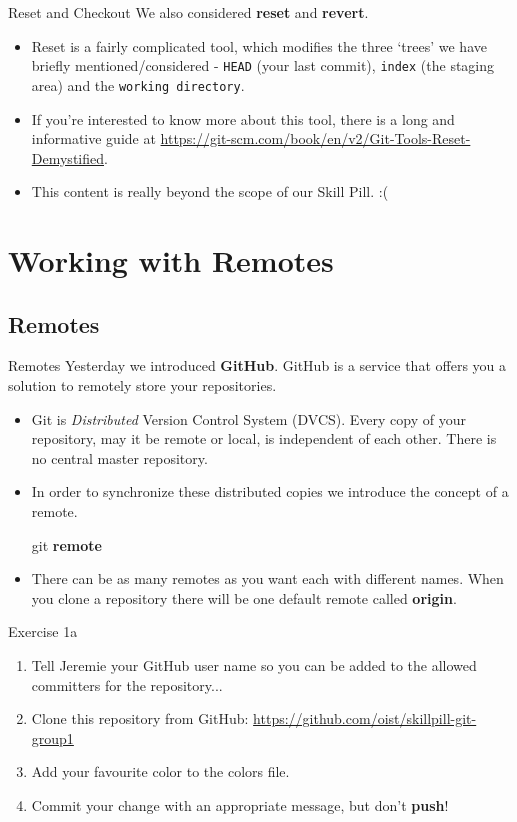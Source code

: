 \documentclass{beamer}
\begin{document}
\begin{frame}[fragile]{Reset and Checkout}
  We also considered \textbf{reset} and \textbf{revert}.
  \begin{itemize}
    \item Reset is a fairly complicated tool, which modifies the three \lq{}trees\rq{} we have briefly mentioned/considered - \texttt{HEAD} (your last commit), \texttt{index} (the staging area) and the \texttt{working directory}.
    \item If you\rq{}re interested to know more about this tool, there is a long and informative guide at \url{https://git-scm.com/book/en/v2/Git-Tools-Reset-Demystified}.
    \item This content is really beyond the scope of our Skill Pill. :(
  \end{itemize}
\end{frame}


\section{Working with Remotes}
\subsection{Remotes}
\begin{frame}[fragile]{Remotes}
Yesterday we introduced \textbf{GitHub}. GitHub is a service that offers you a solution to remotely store your repositories.
\begin{itemize}
    \item Git is \emph{Distributed} Version Control System (DVCS). Every copy of your repository, may it be remote or local, is independent of each other. There is no central master repository. 
    \item In order to synchronize these distributed copies we introduce the concept of a remote.
  \begin{block}{}
    git \textbf{remote}
  \end{block}
  \item There can be as many remotes as you want each with different names. When you clone a repository there will be one default remote called \textbf{origin}.
\end{itemize}
\end{frame}

\begin{frame}
  \begin{block}{Exercise 1a}
    \begin{enumerate}
      \item Tell Jeremie your GitHub user name so you can be added to the allowed committers for the repository...
      \item Clone this repository from GitHub: \url{https://github.com/oist/skillpill-git-group1}
      \item Add your favourite color to the colors file.
      \item Commit your change with an appropriate message, but don\rq{}t \textbf{push}!
    \end{enumerate}
  \end{block}
\end{frame}
\end{document}
